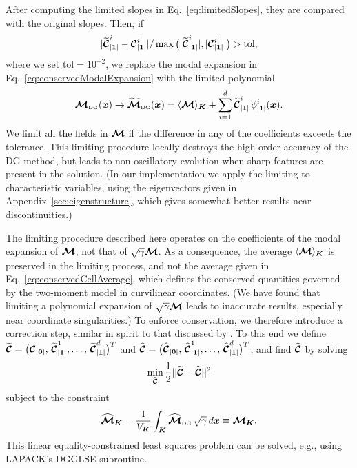 \documentclass[10pt,preprint]{aastex}
\begin{document}
After computing the limited slopes in Eq.~\eqref{eq:limitedSlopes}, they are compared with the original slopes.  
Then, if
\begin{equation}
  |\widetilde{\boldsymbol{\mathcal{C}}}_{|\boldsymbol{1}|}^{i}-\boldsymbol{\mathcal{C}}_{|\boldsymbol{1}|}^{i}|/\max\big(|\widetilde{\boldsymbol{\mathcal{C}}}_{|\boldsymbol{1}|}^{i}|,|\boldsymbol{\mathcal{C}}_{|\boldsymbol{1}|}^{i}|\big)>\text{tol},
\end{equation}
where we set $\text{tol}=10^{-2}$, we replace the modal expansion in Eq.~\eqref{eq:conservedModalExpansion} with the limited polynomial
\begin{equation}
  \boldsymbol{\mathcal{M}}_{\mbox{\tiny DG}}(\boldsymbol{x})
  \to\widetilde{\boldsymbol{\mathcal{M}}}_{\mbox{\tiny DG}}(\boldsymbol{x})
  =\langle\boldsymbol{\mathcal{M}}\rangle_{\boldsymbol{K}}+\sum_{i=1}^{d}\widetilde{\boldsymbol{\mathcal{C}}}_{|\boldsymbol{1}|}^{i}\,\phi_{|\boldsymbol{1}|}^{i}(\boldsymbol{x}).  
  \label{eq:conservedModalExpansionLimited}
\end{equation}
We limit all the fields in $\boldsymbol{\mathcal{M}}$ if the difference in any of the coefficients exceeds the tolerance.  
This limiting procedure locally destroys the high-order accuracy of the DG method, but leads to non-oscillatory evolution when sharp features are present in the solution.  
(In our implementation we apply the limiting to characteristic variables, using the eigenvectors given in Appendix~\ref{sec:eigenstructure}, which gives somewhat better results near discontinuities.)

The limiting procedure described here operates on the coefficients of the modal expansion of $\boldsymbol{\mathcal{M}}$, not that of $\sqrt{\gamma}\boldsymbol{\mathcal{M}}$.  
As a consequence, the average $\langle\boldsymbol{\mathcal{M}}\rangle_{\boldsymbol{K}}$ is preserved in the limiting process, and not the average given in Eq.~\eqref{eq:conservedCellAverage}, which defines the conserved quantities governed by the two-moment model in curvilinear coordinates.  
(We have found that limiting a polynomial expansion of $\sqrt{\gamma}\boldsymbol{\mathcal{M}}$ leads to inaccurate results, especially near coordinate singularities.)  
To enforce conservation, we therefore introduce a correction step, similar in spirit to that discussed by \citet{radiceRezzolla_2011}.  
To this end we define $\widetilde{\boldsymbol{\mathcal{C}}}=\big(\boldsymbol{\mathcal{C}}_{|\boldsymbol{0}|},\,\widetilde{\boldsymbol{\mathcal{C}}}_{|\boldsymbol{1}|}^{1},\ldots,\,\widetilde{\boldsymbol{\mathcal{C}}}_{|\boldsymbol{1}|}^{d}\big)^{T}$ and $\widehat{\boldsymbol{\mathcal{C}}}=\big(\widehat{\boldsymbol{\mathcal{C}}}_{|\boldsymbol{0}|},\,\widehat{\boldsymbol{\mathcal{C}}}_{|\boldsymbol{1}|}^{1},\ldots,\,\widehat{\boldsymbol{\mathcal{C}}}_{|\boldsymbol{1}|}^{d}\big)^{T}$, and find $\widehat{\boldsymbol{\mathcal{C}}}$ by solving
\begin{equation}
  \min_{\widehat{\boldsymbol{\mathcal{C}}}}\frac{1}{2}||\widetilde{\boldsymbol{\mathcal{C}}}-\widehat{\boldsymbol{\mathcal{C}}}||^{2}
\end{equation}
subject to the constraint
\begin{equation}
  \widehat{\boldsymbol{\mathcal{M}}}_{\boldsymbol{K}}=\frac{1}{V_{\boldsymbol{K}}}\int_{\boldsymbol{K}}\widehat{\boldsymbol{\mathcal{M}}}_{\mbox{\tiny DG}}\,\sqrt{\gamma}\,d\boldsymbol{x}\equiv\boldsymbol{\mathcal{M}}_{\boldsymbol{K}}.  
\end{equation}
This linear equality-constrained least squares problem can be solved, e.g., using LAPACK's DGGLSE subroutine.  
\end{document}
